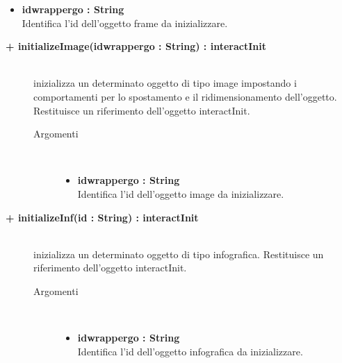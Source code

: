 \begin{description}
\begin{description}
\begin{description}
\begin{itemize}
					\item \textbf{idwrappergo : String			} \hfill \\
						Identifica l'id dell'oggetto frame da inizializzare.
					
				\end{itemize}
		\end{description}
	\end{description}
	
\begin{description}
		\item[\textbf{\color{blue}+ initializeImage(idwrappergo : String) : interactInit			}] \hfill \\
			inizializza un determinato oggetto di tipo image impostando i comportamenti per lo spostamento e il ridimensionamento dell'oggetto. Restituisce un riferimento dell'oggetto interactInit.
			
		\begin{description}
			\item[Argomenti] \hfill \\
				\begin{itemize}
				
					\item \textbf{idwrappergo : String			} \hfill \\
						Identifica l'id dell'oggetto image da inizializzare.
					
				\end{itemize}
		\end{description}
	\end{description}
	
\begin{description}
		\item[\textbf{\color{blue}+ initializeInf(id : String) : interactInit			}] \hfill \\
			inizializza un determinato oggetto di tipo infografica. Restituisce un riferimento dell'oggetto interactInit.
			
		\begin{description}
			\item[Argomenti] \hfill \\
				\begin{itemize}
				
					\item \textbf{idwrappergo : String			} \hfill \\
						Identifica l'id dell'oggetto infografica da inizializzare.
					
				\end{itemize}
		\end{description}
	\end{description}


\end{description}
